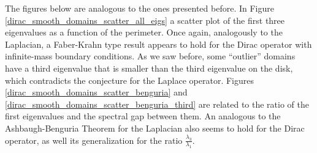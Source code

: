 The figures below are analogous to the ones presented before. In Figure \ref{dirac_smooth_domains_scatter_all_eigs} a scatter plot of the first three eigenvalues as a function of the perimeter. Once again, analogously to the Laplacian, a Faber-Krahn type result appears to hold for the Dirac operator with infinite-mass boundary conditions. As we saw before, some ``outlier'' domains have a third eigenvalue that is smaller than the third eigenvalue on the disk, which contradicts the conjecture for the Laplace operator.
Figures \ref{dirac_smooth_domains_scatter_benguria} and \ref{dirac_smooth_domains_scatter_benguria_third} are related to the ratio of the first eigenvalues and the spectral gap between them. An analogous to the Ashbaugh-Benguria Theorem for the Laplacian also seems to hold for the Dirac operator, as well its generalization for the ratio \(\frac{\lambda_3}{\lambda_1}\).


